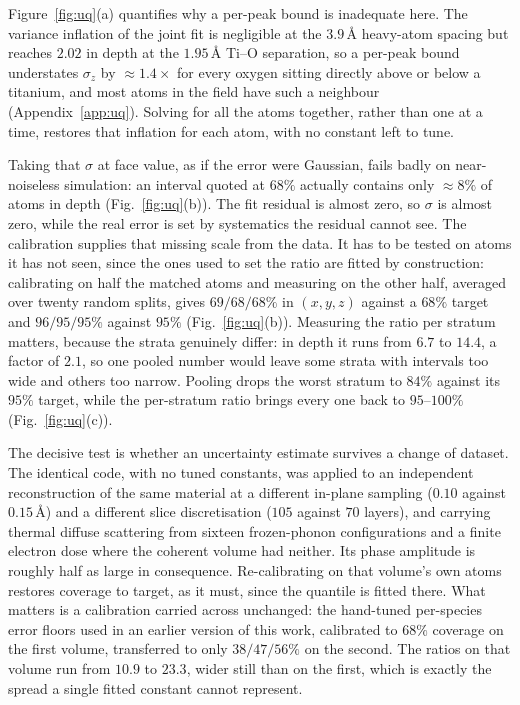 \documentclass[aps,prb,twocolumn,superscriptaddress,floatfix,nofootinbib]{revtex4-2}
\begin{document}
Figure~\ref{fig:uq}(a) quantifies why a per-peak bound is inadequate here. The variance inflation of the joint fit is negligible at the $3.9$\,\AA{} heavy-atom spacing but reaches $2.02$ in depth at the $1.95$\,\AA{} Ti--O separation, so a per-peak bound understates $\sigma_z$ by $\approx1.4\times$ for every oxygen sitting directly above or below a titanium, and most atoms in the field have such a neighbour (Appendix~\ref{app:uq}). Solving for all the atoms together, rather than one at a time, restores that inflation for each atom, with no constant left to tune.

Taking that $\sigma$ at face value, as if the error were Gaussian, fails badly on near-noiseless simulation: an interval quoted at $68\%$ actually contains only $\approx8\%$ of atoms in depth (Fig.~\ref{fig:uq}(b)). The fit residual is almost zero, so $\sigma$ is almost zero, while the real error is set by systematics the residual cannot see. The calibration supplies that missing scale from the data. It has to be tested on atoms it has not seen, since the ones used to set the ratio are fitted by construction: calibrating on half the matched atoms and measuring on the other half, averaged over twenty random splits, gives $69/68/68\%$ in $(x,y,z)$ against a $68\%$ target and $96/95/95\%$ against $95\%$ (Fig.~\ref{fig:uq}(b)). Measuring the ratio per stratum matters, because the strata genuinely differ: in depth it runs from $6.7$ to $14.4$, a factor of $2.1$, so one pooled number would leave some strata with intervals too wide and others too narrow. Pooling drops the worst stratum to $84\%$ against its $95\%$ target, while the per-stratum ratio brings every one back to $95$--$100\%$ (Fig.~\ref{fig:uq}(c)).

The decisive test is whether an uncertainty estimate survives a change of dataset. The identical code, with no tuned constants, was applied to an independent reconstruction of the same material at a different in-plane sampling ($0.10$ against $0.15$\,\AA) and a different slice discretisation ($105$ against $70$ layers), and carrying thermal diffuse scattering from sixteen frozen-phonon configurations and a finite electron dose where the coherent volume had neither. Its phase amplitude is roughly half as large in consequence. Re-calibrating on that volume's own atoms restores coverage to target, as it must, since the quantile is fitted there. What matters is a calibration carried across unchanged: the hand-tuned per-species error floors used in an earlier version of this work, calibrated to $68\%$ coverage on the first volume, transferred to only $38/47/56\%$ on the second. The ratios on that volume run from $10.9$ to $23.3$, wider still than on the first, which is exactly the spread a single fitted constant cannot represent.
\end{document}
